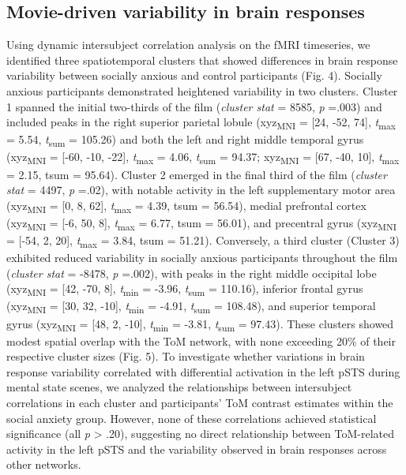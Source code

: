 \subsection*{Movie-driven variability in brain responses}
Using dynamic intersubject correlation analysis on the fMRI timeseries, we identified three spatiotemporal clusters that showed differences in brain response variability between socially anxious and control participants (Fig. 4). Socially anxious participants demonstrated heightened variability in two clusters. Cluster 1 spanned the initial two-thirds of the film (\textit{cluster stat} = 8585, \textit{p} =.003) and included peaks in the right superior parietal lobule (xyz\textsubscript{MNI} = [24, -52, 74], \textit{t}\textsubscript{max} = 5.54, \textit{t}\textsubscript{sum} = 105.26) and both the left and right middle temporal gyrus (xyz\textsubscript{MNI} = [-60, -10, -22], \textit{t}\textsubscript{max} = 4.06, \textit{t}\textsubscript{sum} = 94.37; xyz\textsubscript{MNI} = [67, -40, 10], \textit{t}\textsubscript{max} = 2.15, tsum = 95.64). Cluster 2 emerged in the final third of the film (\textit{cluster stat} = 4497, \textit{p} =.02), with notable activity in the left supplementary motor area (xyz\textsubscript{MNI} = [0, 8, 62], \textit{t}\textsubscript{max} = 4.39, tsum = 56.54), medial prefrontal cortex (xyz\textsubscript{MNI} = [-6, 50, 8], \textit{t}\textsubscript{max} = 6.77, tsum = 56.01), and precentral gyrus (xyz\textsubscript{MNI} = [-54, 2, 20], \textit{t}\textsubscript{max} = 3.84, tsum = 51.21). Conversely, a third cluster (Cluster 3) exhibited reduced variability in socially anxious participants throughout the film (\textit{cluster stat} = -8478, \textit{p} =.002), with peaks in the right middle occipital lobe (xyz\textsubscript{MNI} = [42, -70, 8], \textit{t}\textsubscript{min} = -3.96, \textit{t}\textsubscript{sum} = 110.16), inferior frontal gyrus (xyz\textsubscript{MNI} = [30, 32, -10], \textit{t}\textsubscript{min} = -4.91, \textit{t}\textsubscript{sum} = 108.48), and superior temporal gyrus (xyz\textsubscript{MNI} = [48, 2, -10], \textit{t}\textsubscript{min} = -3.81, \textit{t}\textsubscript{sum} = 97.43). 
These clusters showed modest spatial overlap with the ToM network, with none exceeding 20\% of their respective cluster sizes (Fig. 5). To investigate whether variations in brain response variability correlated with differential activation in the left pSTS during mental state scenes, we analyzed the relationships between intersubject correlations in each cluster and participants' ToM contrast estimates within the social anxiety group. However, none of these correlations achieved statistical significance (all \textit{p} > .20), suggesting no direct relationship between ToM-related activity in the left pSTS and the variability observed in brain responses across other networks. 

